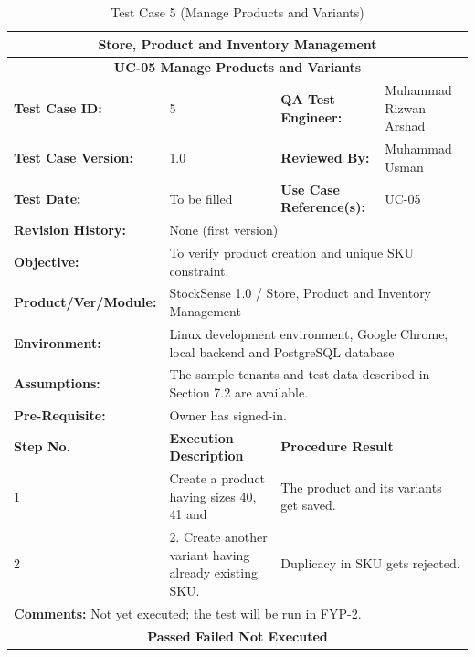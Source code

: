 \documentclass{StockSense}
\begin{document}
\begin{table}[!htbp]
\centering
\caption{Test Case 5 (Manage Products and Variants)}
{\small\linespread{1}\selectfont\renewcommand{\arraystretch}{1.25}
\begin{tabular}{|p{}|p{}|p{}|p{}|}
\hline
\multicolumn{4}{|c|}{\textbf{Store, Product and Inventory Management}} \\ \hline
\multicolumn{4}{|c|}{\textbf{UC-05 Manage Products and Variants}} \\ \hline
\textbf{Test Case ID:} & 5 & \textbf{QA Test Engineer:} & Muhammad Rizwan Arshad \\ \hline
\textbf{Test Case Version:} & 1.0 & \textbf{Reviewed By:} & Muhammad Usman \\ \hline
\textbf{Test Date:} & To be filled & \textbf{Use Case Reference(s):} & UC-05 \\ \hline
\textbf{Revision History:} & \multicolumn{3}{p{\dimexpr0.70\textwidth+4\tabcolsep\relax}|}{None (first version)} \\ \hline
\textbf{Objective:} & \multicolumn{3}{p{\dimexpr0.70\textwidth+4\tabcolsep\relax}|}{To verify product creation and unique SKU constraint.} \\ \hline
\textbf{Product/Ver/Module:} & \multicolumn{3}{p{\dimexpr0.70\textwidth+4\tabcolsep\relax}|}{StockSense 1.0 / Store, Product and Inventory Management} \\ \hline
\textbf{Environment:} & \multicolumn{3}{p{\dimexpr0.70\textwidth+4\tabcolsep\relax}|}{Linux development environment, Google Chrome, local backend and PostgreSQL database} \\ \hline
\textbf{Assumptions:} & \multicolumn{3}{p{\dimexpr0.70\textwidth+4\tabcolsep\relax}|}{The sample tenants and test data described in Section 7.2 are available.} \\ \hline
\textbf{Pre-Requisite:} & \multicolumn{3}{p{\dimexpr0.70\textwidth+4\tabcolsep\relax}|}{Owner has signed-in.} \\ \hline
\textbf{Step No.} & \textbf{Execution Description} & \multicolumn{2}{l|}{\textbf{Procedure Result}} \\ \hline
1 & Create a product having sizes 40, 41 and & \multicolumn{2}{p{\dimexpr0.42\textwidth+2\tabcolsep\relax}|}{The product and its variants get saved.} \\ \hline
2 & 2. Create another variant having already existing SKU. & \multicolumn{2}{p{\dimexpr0.42\textwidth+2\tabcolsep\relax}|}{Duplicacy in SKU gets rejected.} \\ \hline
\multicolumn{4}{|l|}{\textbf{Comments:} Not yet executed; the test will be run in FYP-2.} \\ \hline
\multicolumn{4}{|c|}{\textbf{Passed \quad Failed \quad Not Executed}} \\ \hline
\end{tabular}\par}
\end{table}
\end{document}
